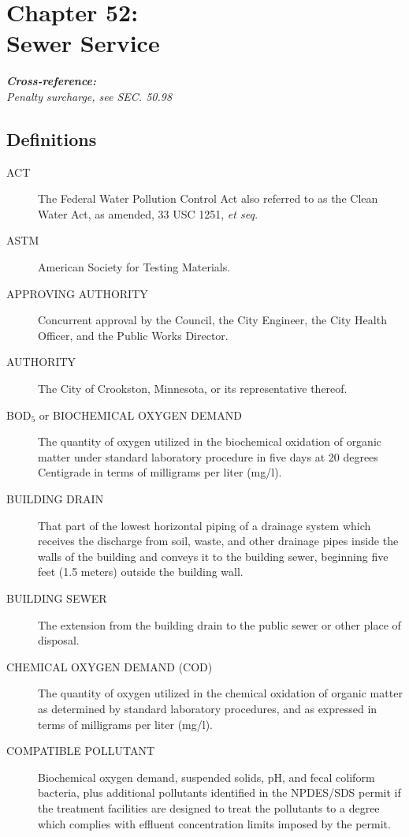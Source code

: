 \chapter*{Chapter 52: \\
	Sewer Service}
    \vfill
    \minitoc
    \textbf{\emph{{Cross-reference:}}}\\
    \indent\emph{Penalty surcharge, see SEC. 50.98}
    \pagebreak



\section{Definitions}
\begin{description}
\item[ACT] The Federal Water Pollution Control Act also referred to as the Clean Water Act, as amended, 33 USC 1251, \emph{et seq.}
\item[ASTM] American Society for Testing Materials.
\item[APPROVING AUTHORITY] Concurrent approval by the Council, the City Engineer, the City Health Officer, and the Public Works Director.
\item[AUTHORITY] The City of Crookston, Minnesota, or its representative thereof.
\item[BOD$_{5}$ or BIOCHEMICAL OXYGEN DEMAND] The quantity of oxygen utilized in the biochemical oxidation of organic matter under standard laboratory procedure in five days at 20 degrees Centigrade in terms of milligrams per liter (mg/l).
\item[BUILDING DRAIN] That part of the lowest horizontal piping of a drainage system which receives the discharge from soil, waste, and other drainage pipes inside the walls of the building and conveys it to the building sewer, beginning five feet (1.5 meters) outside the building wall.
\item[BUILDING SEWER] The extension from the building drain to the public sewer or other place of disposal.
\item[CHEMICAL OXYGEN DEMAND (COD)] The quantity of oxygen utilized in the chemical oxidation of organic matter as determined by standard laboratory procedures, and as expressed in terms of milligrams per liter (mg/l).
\item[COMPATIBLE POLLUTANT] Biochemical oxygen demand, suspended solids, pH, and fecal coliform bacteria, plus additional pollutants identified in the NPDES/SDS permit if the treatment facilities are designed to treat the pollutants to a degree which complies with effluent concentration limits imposed by the permit.

\end{description}
